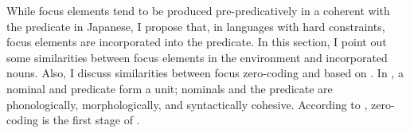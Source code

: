 While focus elements tend to be produced pre-predicatively in a coherent  with the predicate in Japanese,
I propose that, in languages with hard constraints,
focus elements are incorporated into the predicate.
In this section,
I point out some similarities between focus elements in the  environment and incorporated nouns.
Also, I discuss similarities between focus zero-coding and  based on .
In ,
a nominal and predicate form a unit;
nominals and the predicate are phonologically, morphologically, and syntactically {cohesive}.
According to ,
zero-coding is the first stage of .

